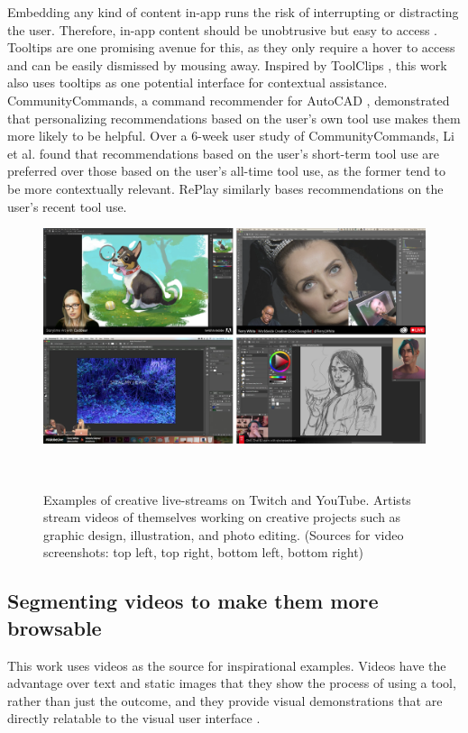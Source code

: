 Embedding any kind of content in-app runs the risk of interrupting or distracting the user. Therefore, in-app content should be unobtrusive but easy to access \cite{Grossman2010a}. Tooltips are one promising avenue for this, as they only require a hover to access and can be easily dismissed by mousing away. Inspired by ToolClips \cite{Grossman2010a}, this work also uses tooltips as one potential interface for contextual assistance. 
CommunityCommands, a command recommender for AutoCAD \cite{Matejka2009}, demonstrated that personalizing recommendations based on the user's own tool use makes them more likely to be helpful. Over a 6-week user study of CommunityCommands, Li et al. \cite{Li2011} found that recommendations based on the user's short-term tool use are preferred over those based on the user's all-time tool use, as the former tend to be more contextually relevant. RePlay similarly bases recommendations on the user's recent tool use.

\begin{figure}[b!]
\centering
  \includegraphics[width=\columnwidth]{liveclips/figures/streamers.png}
  \caption{Examples of creative live-streams on Twitch and YouTube. Artists stream videos of themselves working on creative projects such as graphic design, illustration, and photo editing. (Sources for video screenshots: top left\protect\footnotemark, top right\protect\footnotemark, bottom left\protect\footnotemark, bottom right\protect\footnotemark)}~\label{fig:liveclips_streamers}
\end{figure}

\subsection{Segmenting videos to make them more browsable}
This work uses videos as the source for inspirational examples. Videos have the advantage over text and static images that they show the process of using a tool, rather than just the outcome, and they provide visual demonstrations that are directly relatable to the visual user interface \cite{Grossman2010a}.

